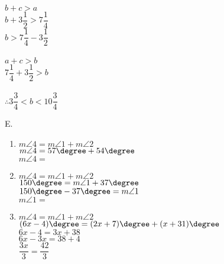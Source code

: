 \begin{multicols}{2}
\begin{enumerate}[label = \arabic*. ]
$ b+c>a $ \redcheck \\
$ b+ 3\dfrac{1}{2}>7\dfrac{1}{4}  $ \redcheck \\
$ b>7\dfrac{1}{4} -3\dfrac{1}{2}  $ \redcheck \\
 \redcheck \\

$ a+c>b $ \redcheck \\
$ 7\dfrac{1}{4} +3\dfrac{1}{2}>b $ \redcheck \\
 \redcheck \\

$\therefore 3\dfrac{3}{4}< b<10\dfrac{3}{4} $ \redcheck 
\end{enumerate}   

E. 
\begin{enumerate}[label = \arabic*. ]
\item $ m\angle{4} = m\angle{1} + m\angle{2} $ \redcheck \\
$ m\angle{4} = 57\degree  + 54\degree  $ \redcheck \\
$ m\angle{4} =$\fbox{$ 111 \degree $} \redcheck 
 
\item $ m\angle{4} = m\angle{1} + m\angle{2} $ \redcheck \\
$ 150 \degree= m\angle{1} + 37 \degree$ \redcheck \\
$ 150 \degree-37\degree= m\angle{1} $ \redcheck \\
$m\angle{1} =$ \fbox{$113 \degree$} \redcheck 
 
\item $ m\angle{4} = m\angle{1} + m\angle{2} $ \redcheck \\
$ (6x-4)\degree = (2x+7)\degree + (x+31)\degree $ \redcheck \\
$ 6x-4 = 3x+38 $ \redcheck \\
$ 6x-3x = 38+4 $ \redcheck \\
$ \dfrac{3x}{3}  = \dfrac{42}{3}  $ \redcheck \\
 \redcheck 
 
\end{enumerate}   

\end{multicols} 